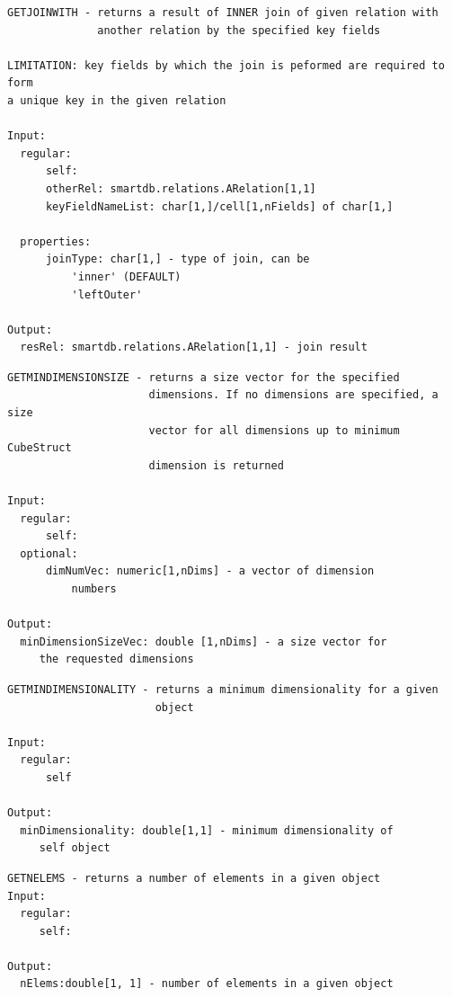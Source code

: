 \documentclass[letterpaper,10pt,english]{sphinxmanual}
\begin{document}
\begin{Verbatim}[commandchars=\\\{\}]
GETJOINWITH - returns a result of INNER join of given relation with
              another relation by the specified key fields

LIMITATION: key fields by which the join is peformed are required to form
a unique key in the given relation

Input:
  regular:
      self:
      otherRel: smartdb.relations.ARelation[1,1]
      keyFieldNameList: char[1,]/cell[1,nFields] of char[1,]

  properties:
      joinType: char[1,] - type of join, can be
          'inner' (DEFAULT)
          'leftOuter'

Output:
  resRel: smartdb.relations.ARelation[1,1] - join result
\end{Verbatim}
\label{chap_func:smartdb-relations-atypifiedstaticrelation-getmindimensionsize}
\begin{Verbatim}[commandchars=\\\{\}]
GETMINDIMENSIONSIZE - returns a size vector for the specified
                      dimensions. If no dimensions are specified, a size
                      vector for all dimensions up to minimum CubeStruct
                      dimension is returned

Input:
  regular:
      self:
  optional:
      dimNumVec: numeric[1,nDims] - a vector of dimension
          numbers

Output:
  minDimensionSizeVec: double [1,nDims] - a size vector for
     the requested dimensions
\end{Verbatim}
\label{chap_func:smartdb-relations-atypifiedstaticrelation-getmindimensionality}
\begin{Verbatim}[commandchars=\\\{\}]
GETMINDIMENSIONALITY - returns a minimum dimensionality for a given
                       object

Input:
  regular:
      self

Output:
  minDimensionality: double[1,1] - minimum dimensionality of
     self object
\end{Verbatim}
\label{chap_func:smartdb-relations-atypifiedstaticrelation-getnelems}
\begin{Verbatim}[commandchars=\\\{\}]
GETNELEMS - returns a number of elements in a given object
Input:
  regular:
     self:

Output:
  nElems:double[1, 1] - number of elements in a given object
\end{Verbatim}
\end{document}
